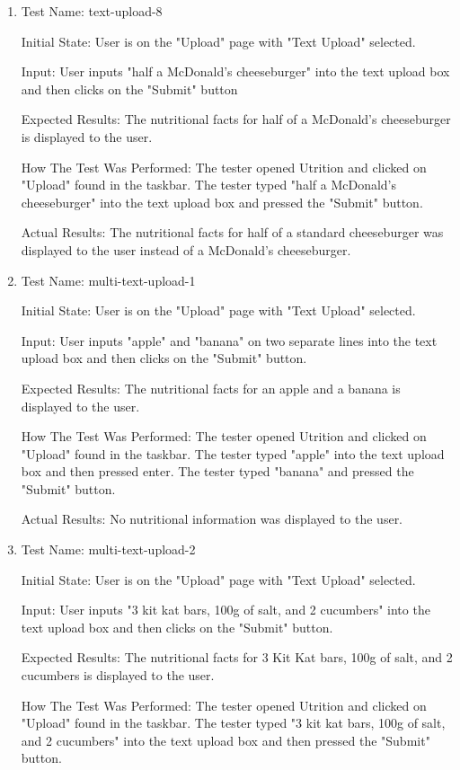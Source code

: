 \documentclass[12pt, titlepage]{article}
\begin{document}
\begin{enumerate}
		\item{Test Name: text-upload-8}
		
		Initial State: User is on the "Upload" page with "Text Upload" selected.
		
		Input: User inputs "half a McDonald's cheeseburger" into the text upload box and then clicks on the "Submit" button
		
		Expected Results: The nutritional facts for half of a McDonald's cheeseburger is displayed to the user.
		
		How The Test Was Performed: The tester opened Utrition and clicked on "Upload" found in the taskbar. The tester typed "half a McDonald's cheeseburger" into the text upload box and pressed the "Submit" button.
		
		Actual Results: The nutritional facts for half of a standard cheeseburger was displayed to the user instead of a McDonald's cheeseburger.
		
		\item{Test Name: multi-text-upload-1}
		
		Initial State: User is on the "Upload" page with "Text Upload" selected.
		
		Input: User inputs "apple" and "banana" on two separate lines into the text upload box and then clicks on the "Submit" button.
		
		Expected Results: The nutritional facts for an apple and a banana is displayed to the user.
		
		How The Test Was Performed: The tester opened Utrition and clicked on "Upload" found in the taskbar. The tester typed "apple" into the text upload box and then pressed enter. The tester typed "banana" and pressed the "Submit" button.
		
		Actual Results: No nutritional information was displayed to the user.
		
		\item{Test Name: multi-text-upload-2}
		
		Initial State: User is on the "Upload" page with "Text Upload" selected.
		
		Input: User inputs "3 kit kat bars, 100g of salt, and 2 cucumbers" into the text upload box and then clicks on the "Submit" button.
		
		Expected Results: The nutritional facts for 3 Kit Kat bars, 100g of salt, and 2 cucumbers is displayed to the user.
		
		How The Test Was Performed: The tester opened Utrition and clicked on "Upload" found in the taskbar. The tester typed "3 kit kat bars, 100g of salt, and 2 cucumbers" into the text upload box and then pressed the "Submit" button.
		

\end{enumerate}
\end{document}
